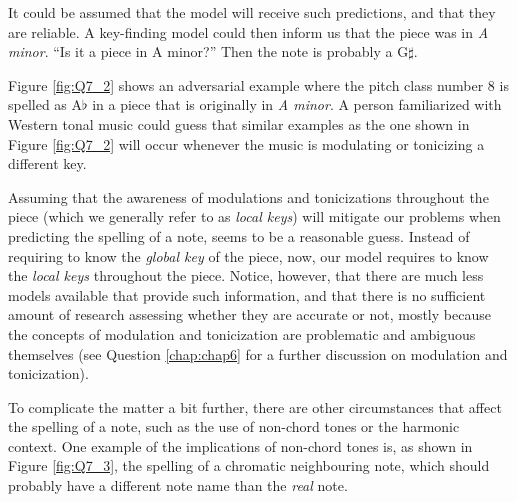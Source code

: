 It could be assumed that the model will receive such
predictions, and that they are reliable. A key-finding
model could then inform us that the piece was in \emph{A
minor}. ``Is it a piece in A minor?'' Then the note is
probably a G$\sharp$.


Figure \ref{fig:Q7_2} shows an adversarial example where
the pitch class number 8 is spelled as A$\flat$ in a piece
that is originally in \emph{A minor}. A person
familiarized with Western tonal music could guess that
similar examples as the one shown in Figure \ref{fig:Q7_2}
will occur whenever the music is modulating or tonicizing
a different key.

Assuming that the awareness of modulations and
tonicizations throughout the piece (which we generally
refer to as \emph{local keys}) will mitigate our problems
when predicting the spelling of a note, seems to be a
reasonable guess. Instead of requiring to know the
\emph{global key} of the piece, now, our model requires to
know the \emph{local keys} throughout the piece. Notice,
however, that there are much less models available that
provide such information, and that there is no sufficient
amount of research assessing whether they are accurate or
not, mostly because the concepts of modulation and
tonicization are problematic and ambiguous themselves (see
Question \ref{chap:chap6} for a further discussion on
modulation and tonicization).

To complicate the matter a bit further, there are other
circumstances that affect the spelling of a note, such as
the use of non-chord tones or the harmonic context. One
example of the implications of non-chord tones is, as
shown in Figure \ref{fig:Q7_3}, the spelling of a
chromatic neighbouring note, which should probably have a
different note name than the \emph{real} note.



